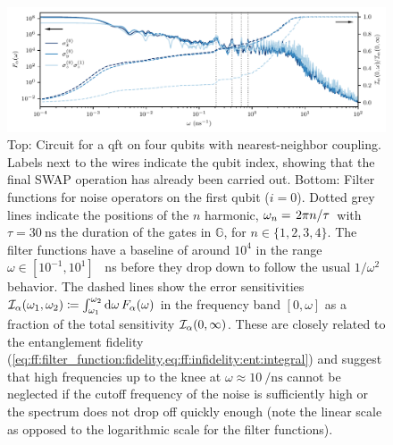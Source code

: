\begin{figure}[tbp]
    \centerline{}
    \includegraphics[width=\textwidth]{img/pdf/qft_filter_function_first_qubit_with_cumulative_fraction.pdf}
    \caption{
        Top: Circuit for a \gls{qft} on four qubits with nearest-neighbor coupling.
        Labels next to the wires indicate the qubit index, showing that the final SWAP operation has already been carried out.
        Bottom: Filter functions for noise operators on the first qubit ($i = 0$).
        Dotted grey lines indicate the positions of the $n$ harmonic, $\omega_n = \flatfrac{2\pi n}{\tau}$ with $\tau = \qty{30}{\nano\second}$ the duration of the gates in $\mathbb{G}$, for $n\in\lbrace 1, 2, 3, 4\rbrace$.
        The filter functions have a baseline of around $10^4$ in the range $\omega\in[10^{-1}, 10^{1}]$ \si{\per\nano\second} before they drop down to follow the usual $1/\omega^2$ behavior.
        The dashed lines show the error sensitivities $\mathcal{I}_\alpha(\omega_1,\omega_2)\coloneqq\int_{\omega_1}^{\omega_2}\dd{\omega} F_\alpha(\omega)$ in the frequency band $[0, \omega]$ as a fraction of the total sensitivity $\mathcal{I}_\alpha(0,\infty)$.
        These are closely related to the entanglement fidelity (\cf \cref{eq:ff:filter_function:fidelity,eq:ff:infidelity:ent:integral}) and suggest that high frequencies up to the knee at $\omega\approx\qty{10}{\per\nano\second}$ cannot be neglected if the cutoff frequency of the noise is sufficiently high or the spectrum does not drop off quickly enough (note the linear scale as opposed to the logarithmic scale for the filter functions).
    }
    \label{fig:ff:qft}
\end{figure}

